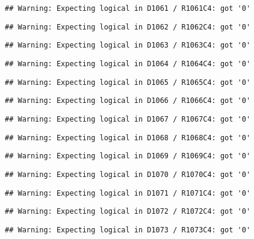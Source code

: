 \documentclass[
]{article}
\begin{document}
\begin{verbatim}
## Warning: Expecting logical in D1061 / R1061C4: got '0'
\end{verbatim}

\begin{verbatim}
## Warning: Expecting logical in D1062 / R1062C4: got '0'
\end{verbatim}

\begin{verbatim}
## Warning: Expecting logical in D1063 / R1063C4: got '0'
\end{verbatim}

\begin{verbatim}
## Warning: Expecting logical in D1064 / R1064C4: got '0'
\end{verbatim}

\begin{verbatim}
## Warning: Expecting logical in D1065 / R1065C4: got '0'
\end{verbatim}

\begin{verbatim}
## Warning: Expecting logical in D1066 / R1066C4: got '0'
\end{verbatim}

\begin{verbatim}
## Warning: Expecting logical in D1067 / R1067C4: got '0'
\end{verbatim}

\begin{verbatim}
## Warning: Expecting logical in D1068 / R1068C4: got '0'
\end{verbatim}

\begin{verbatim}
## Warning: Expecting logical in D1069 / R1069C4: got '0'
\end{verbatim}

\begin{verbatim}
## Warning: Expecting logical in D1070 / R1070C4: got '0'
\end{verbatim}

\begin{verbatim}
## Warning: Expecting logical in D1071 / R1071C4: got '0'
\end{verbatim}

\begin{verbatim}
## Warning: Expecting logical in D1072 / R1072C4: got '0'
\end{verbatim}

\begin{verbatim}
## Warning: Expecting logical in D1073 / R1073C4: got '0'
\end{verbatim}
\end{document}
